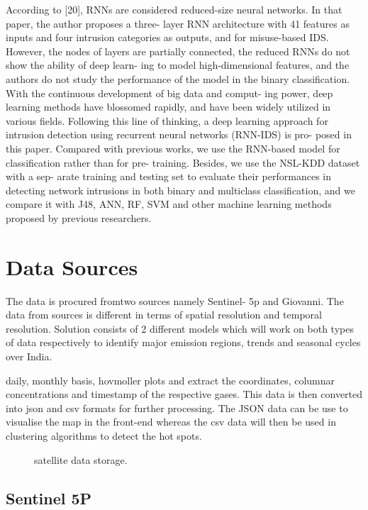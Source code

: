 \documentclass[12pt]{report}	%
\newcommand{\squeezeup}{\vspace{-0.6cm}}
\begin{document}
According to [20], RNNs are considered reduced-size neural networks. In that paper, the author proposes a three-
layer RNN architecture with 41 features as inputs and four
intrusion categories as outputs, and for misuse-based IDS.
However, the nodes of layers are partially connected,
the reduced RNNs do not show the ability of deep learn-
ing to model high-dimensional features, and the authors
do not study the performance of the model in the binary
classification.
With the continuous development of big data and comput-
ing power, deep learning methods have blossomed rapidly,
and have been widely utilized in various fields. Following
this line of thinking, a deep learning approach for intrusion
detection using recurrent neural networks (RNN-IDS) is pro-
posed in this paper. Compared with previous works, we use
the RNN-based model for classification rather than for pre-
training. Besides, we use the NSL-KDD dataset with a sep-
arate training and testing set to evaluate their performances
in detecting network intrusions in both binary and multiclass
classification, and we compare it with J48, ANN, RF, SVM
and other machine learning methods proposed by previous
researchers.
\chapter{Data Sources }
The data is procured fromtwo sources namely Sentinel-
5p and Giovanni. The data from sources is different
in terms of spatial resolution and temporal resolution.
Solution consists of 2 different models which will work
on both types of data respectively to identify major
emission regions, trends and seasonal cycles over India.

daily, monthly basis, hovmoller plots and extract the
coordinates, columnar concentrations and timestamp
of the respective gases. This data is then converted into
json and csv formats for further processing. The JSON
data can be use to visualise the map in the front-end
whereas the csv data will then be used in clustering
algorithms to detect the hot spots.
\begin{figure}[!h]
	\captionsetup{font=scriptsize}
	\begin{center}
		\centerline{}
		\caption{satellite data storage.}
		\label{fig:1}
	\end{center}
	\squeezeup
\end{figure}

\section{Sentinel 5P}
\end{document}
